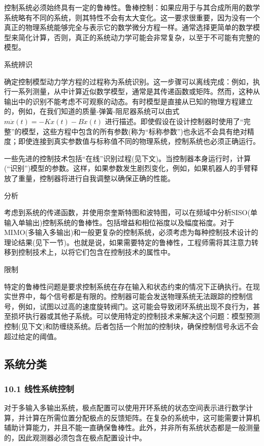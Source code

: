 控制系统必须始终具有一定的鲁棒性。鲁棒控制：如果应用于与其合成所用的数学系统略有不同的系统，则其特性不会有太大变化。这一要求很重要，因为没有一个真正的物理系统能够完全与表示它的数学微分方程一样。通常选择更简单的数学模型来简化计算，否则，真正的系统动力学可能会非常复杂，以至于不可能有完整的模型。

系统辨识

确定控制模型动力学方程的过程称为系统识别。这一步骤可以离线完成：例如，执行一系列测量，从中计算近似数学模型，通常是其传递函数或矩阵。然而，这种从输出中的识别不能考虑不可观察的动态。有时模型是直接从已知的物理方程建立的，例如，在我们知道的质量-弹簧-阻尼器系统可以由式$m\ddot{x}(t) = -Kx(t) - B\dot{x}(t)$ 进行描述。即使假设在设计控制器时使用了“完整”的模型，这些方程中包含的所有参数(称为“标称参数”)也永远不会具有绝对精度；即使连接到真实参数值与标称值不同的物理系统，控制系统也必须正确运行。

一些先进的控制技术包括“在线”识别过程(见下文)。当控制器本身运行时，计算(“识别”)模型的参数。这样，如果参数发生剧烈变化，例如，如果机器人的手臂释放了重量，控制器将进行自我调整以确保正确的性能。

分析

考虑到系统的传递函数，并使用奈奎斯特图和波特图，可以在频域中分析SISO(单输入单输出)控制系统的鲁棒性。包括增益和相位裕度以及幅度裕度。对于MIMO(多输入多输出)和一般更复杂的控制系统，必须考虑为每种控制技术设计的理论结果(见下一节)。也就是说，如果需要特定的鲁棒性，工程师需将其注意力转移到控制技术上，以将它们包含在控制技术的属性中。

限制

特定的鲁棒性问题是要求控制系统在存在输入和状态约束的情况下正确执行。在现实世界中，每个信号都是有限的。控制器可能会发送物理系统无法跟踪的控制信号，例如，试图以过高的速度旋转阀门。这可能会导致闭环系统出现不良行为，甚至损坏执行器或其他子系统。可以使用特定的控制技术来解决这个问题：模型预测控制(见下文)和防缠绕系统。后者包括一个附加的控制块，确保控制信号永远不会超过给定的阈值。

\subsection{系统分类}

\subsubsection{10.1 线性系统控制}

对于多输入多输出系统，极点配置可以使用开环系统的状态空间表示进行数学计算，并计算在所需位置分配极点的反馈矩阵。在复杂的系统中，这可能需要计算机辅助计算能力，并且不能一直确保鲁棒性。此外，并非所有系统状态都是一般测量的，因此观测器必须包含在极点配置设计中。

